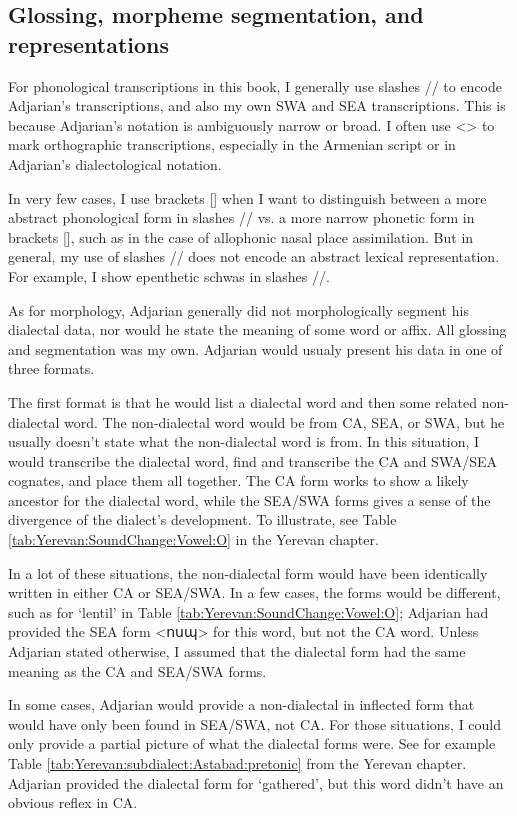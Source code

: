 \subsection{Glossing, morpheme segmentation, and representations}\label{sec:HossepIntro:translation:gloss}

For phonological transcriptions in this book, I generally use slashes // to encode Adjarian's transcriptions, and also my own SWA and SEA transcriptions. This is because Adjarian's notation is ambiguously narrow or broad. I often use <> to mark orthographic transcriptions, especially in the Armenian script or in Adjarian's dialectological notation. 

In very few cases, I use brackets [] when I want to distinguish between a more abstract phonological form in slashes // vs. a more narrow phonetic form in brackets [], such as in the case of allophonic nasal place assimilation. But in general, my use of slashes // does not encode an abstract lexical representation. For example, I show epenthetic schwas in slashes //. 

As for morphology,  Adjarian generally did not morphologically segment his dialectal data, nor would he state the meaning of some word or affix. All glossing and segmentation was my own. Adjarian would usualy present his data in one of three formats. 


The first format is that he would list a dialectal word and then some related non-dialectal word. The non-dialectal word would be from CA, SEA, or SWA, but he usually doesn't state what the non-dialectal word is from. In this situation, I would transcribe the dialectal word, find and transcribe the CA and SWA/SEA cognates, and place them all together. The CA form works to show a likely ancestor for the dialectal word, while the SEA/SWA forms gives a sense of the divergence of the dialect's development. To illustrate,  see Table \ref{tab:Yerevan:SoundChange:Vowel:O} in  the Yerevan chapter.  


In a lot of these situations, the non-dialectal form would have been identically written in either CA or SEA/SWA. In a few cases, the forms would be different, such as for `lentil' in Table \ref{tab:Yerevan:SoundChange:Vowel:O}; Adjarian had provided the SEA form <ոսպ> for this word, but not the CA word. Unless Adjarian stated otherwise, I assumed that the dialectal form had the same meaning as the CA and SEA/SWA forms. 

In some cases, Adjarian would provide a non-dialectal in inflected form that would have only been found in SEA/SWA, not CA. For those situations, I could only provide a partial picture of what the dialectal forms were. See for example  Table \ref{tab:Yerevan:subdialect:Astabad:pretonic} from the Yerevan chapter. Adjarian provided the dialectal form for `gathered', but this word didn't have an obvious reflex in CA. 

